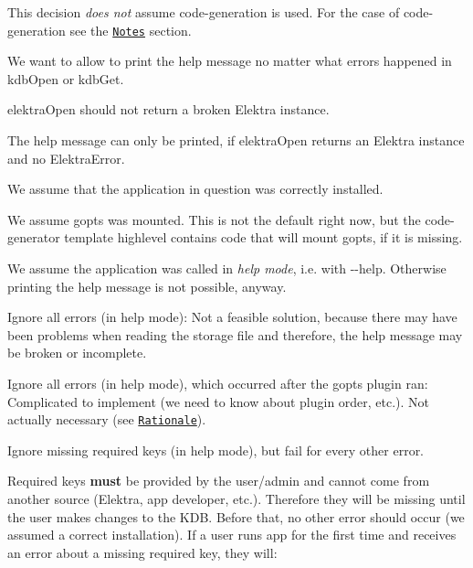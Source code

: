 This decision {\itshape does not} assume code-\/generation is used. For the case of code-\/generation see the \href{#notes}{\tt Notes} section.

We want to allow to print the help message no matter what errors happened in {\ttfamily kdb\+Open} or {\ttfamily kdb\+Get}.


\begin{DoxyItemize}
\item {\ttfamily elektra\+Open} should not return a broken {\ttfamily Elektra} instance.
\item The help message can only be printed, if {\ttfamily elektra\+Open} returns an {\ttfamily Elektra} instance and no {\ttfamily Elektra\+Error}.
\end{DoxyItemize}


\begin{DoxyItemize}
\item We assume that the application in question was correctly installed.
\item We assume {\ttfamily gopts} was mounted. This is not the default right now, but the code-\/generator template {\ttfamily highlevel} contains code that will mount {\ttfamily gopts}, if it is missing.
\item We assume the application was called in {\itshape help mode}, i.\+e. with {\ttfamily -\/-\/help}. Otherwise printing the help message is not possible, anyway.
\end{DoxyItemize}


\begin{DoxyItemize}
\item Ignore all errors (in help mode)\+: Not a feasible solution, because there may have been problems when reading the storage file and therefore, the help message may be broken or incomplete.
\item Ignore all errors (in help mode), which occurred after the {\ttfamily gopts} plugin ran\+: Complicated to implement (we need to know about plugin order, etc.). Not actually necessary (see \href{#rationale}{\tt Rationale}).
\end{DoxyItemize}

Ignore missing {\ttfamily require}d keys (in help mode), but fail for every other error.

Required keys {\bfseries must} be provided by the user/admin and cannot come from another source (Elektra, app developer, etc.). Therefore they will be missing until the user makes changes to the K\+DB. Before that, no other error should occur (we assumed a correct installation). If a user runs {\ttfamily app} for the first time and receives an error about a missing required key, they will\+:


